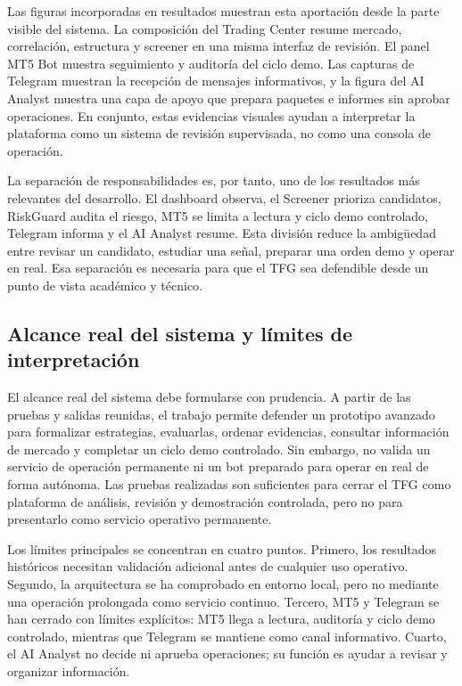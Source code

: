 Las figuras incorporadas en resultados muestran esta aportaci\'on desde la parte
visible del sistema. La composici\'on del Trading Center resume mercado,
correlaci\'on, estructura y screener en una misma interfaz de revisi\'on. El
panel MT5 Bot muestra seguimiento y auditor\'ia del ciclo demo. Las capturas de
Telegram muestran la recepci\'on de mensajes informativos, y la figura del AI
Analyst muestra una capa de apoyo que prepara paquetes e informes sin aprobar
operaciones. En conjunto, estas evidencias visuales ayudan a interpretar la
plataforma como un sistema de revisi\'on supervisada, no como una consola de
operaci\'on.

La separaci\'on de responsabilidades es, por tanto, uno de los resultados m\'as
relevantes del desarrollo. El dashboard observa, el Screener prioriza candidatos,
RiskGuard audita el riesgo, MT5 se limita a lectura y ciclo demo controlado,
Telegram informa y el AI Analyst resume. Esta divisi\'on reduce la ambig\"uedad
entre revisar un candidato, estudiar una se\~nal, preparar una orden demo y
operar en real. Esa separaci\'on es necesaria para que el TFG sea defendible desde
un punto de vista acad\'emico y t\'ecnico.

\subsection{Alcance real del sistema y l\'imites de interpretaci\'on}
\label{subsec:discusion-alcance-limites}

El alcance real del sistema debe formularse con prudencia. A partir de las
pruebas y salidas reunidas, el trabajo permite defender un prototipo avanzado para
formalizar estrategias, evaluarlas, ordenar evidencias, consultar informaci\'on de mercado y
completar un ciclo demo controlado. Sin embargo, no valida un servicio de
operaci\'on permanente ni un bot preparado para operar en real de forma
aut\'onoma. Las pruebas realizadas son suficientes para cerrar el TFG como
plataforma de an\'alisis, revisi\'on y demostraci\'on controlada, pero no para
presentarlo como servicio operativo permanente.

Los l\'imites principales se concentran en cuatro puntos. Primero, los resultados
hist\'oricos necesitan validaci\'on adicional antes de cualquier uso operativo.
Segundo, la arquitectura se ha comprobado en entorno local, pero no mediante una
operaci\'on prolongada como servicio continuo. Tercero, MT5 y Telegram se han
cerrado con l\'imites expl\'icitos: MT5 llega a lectura, auditor\'ia y ciclo demo
controlado, mientras que Telegram se mantiene como canal informativo. Cuarto, el
AI Analyst no decide ni aprueba operaciones; su funci\'on es ayudar a revisar y
organizar informaci\'on.

